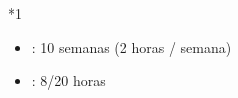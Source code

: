 \documentclass[letterpaper,10pt,spanish]{sphinxmanual}
\begin{document}
\begin{savenotes}
\begin{tabular}[t]{}
\begin{savenotes}
\begin{tabular}[t]{*{1}{}}
\begin{itemize}
\item {} 
\sphinxAtStartPar
{}: 10 semanas (2 horas / semana)

\item {} 
\sphinxAtStartPar
{}: 8/20 horas

\end{itemize}
\\
\sphinxbottomrule
\end{tabular}
\sphinxtableafterendhook\par
\sphinxattableend\end{savenotes}
\\
\sphinxbottomrule
\end{tabular}
\sphinxtableafterendhook\par
\sphinxattableend\end{savenotes}
\end{document}
